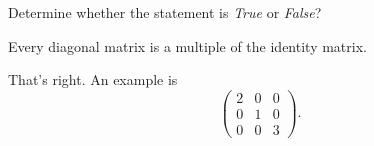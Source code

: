 \documentclass{ximera}
\begin{document}

%
%
%
%
%





\problemlabel

\noindent Determine whether the statement is {\em True\/} or {\em False\/}?

\begin{exercise} \label{c1.3.4b}
  Every diagonal matrix is a multiple of the identity matrix.
  \begin{multipleChoice}
  \end{multipleChoice}
  \begin{feedback}[correct]
    That's right.   An example is
    \[\left(\begin{array}{ccc}
              2 & 0 & 0 \\
              0 & 1 & 0 \\
              0 & 0 & 3 \end{array}\right).\]
  \end{feedback}
  
\end{exercise}


\end{document}
